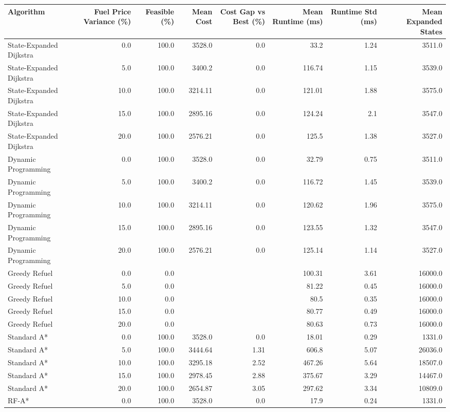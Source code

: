 \begin{tabular}{lrrrrrrr}
\hline
Algorithm & Fuel Price Variance (\%) & Feasible (\%) & Mean Cost & Cost Gap vs Best (\%) & Mean Runtime (ms) & Runtime Std (ms) & Mean Expanded States \\
\hline
State-Expanded Dijkstra & 0.0 & 100.0 & 3528.0 & 0.0 & 33.2 & 1.24 & 3511.0 \\
State-Expanded Dijkstra & 5.0 & 100.0 & 3400.2 & 0.0 & 116.74 & 1.15 & 3539.0 \\
State-Expanded Dijkstra & 10.0 & 100.0 & 3214.11 & 0.0 & 121.01 & 1.88 & 3575.0 \\
State-Expanded Dijkstra & 15.0 & 100.0 & 2895.16 & 0.0 & 124.24 & 2.1 & 3547.0 \\
State-Expanded Dijkstra & 20.0 & 100.0 & 2576.21 & 0.0 & 125.5 & 1.38 & 3527.0 \\
Dynamic Programming & 0.0 & 100.0 & 3528.0 & 0.0 & 32.79 & 0.75 & 3511.0 \\
Dynamic Programming & 5.0 & 100.0 & 3400.2 & 0.0 & 116.72 & 1.45 & 3539.0 \\
Dynamic Programming & 10.0 & 100.0 & 3214.11 & 0.0 & 120.62 & 1.96 & 3575.0 \\
Dynamic Programming & 15.0 & 100.0 & 2895.16 & 0.0 & 123.55 & 1.32 & 3547.0 \\
Dynamic Programming & 20.0 & 100.0 & 2576.21 & 0.0 & 125.14 & 1.14 & 3527.0 \\
Greedy Refuel & 0.0 & 0.0 &  &  & 100.31 & 3.61 & 16000.0 \\
Greedy Refuel & 5.0 & 0.0 &  &  & 81.22 & 0.45 & 16000.0 \\
Greedy Refuel & 10.0 & 0.0 &  &  & 80.5 & 0.35 & 16000.0 \\
Greedy Refuel & 15.0 & 0.0 &  &  & 80.77 & 0.49 & 16000.0 \\
Greedy Refuel & 20.0 & 0.0 &  &  & 80.63 & 0.73 & 16000.0 \\
Standard A* & 0.0 & 100.0 & 3528.0 & 0.0 & 18.01 & 0.29 & 1331.0 \\
Standard A* & 5.0 & 100.0 & 3444.64 & 1.31 & 606.8 & 5.07 & 26036.0 \\
Standard A* & 10.0 & 100.0 & 3295.18 & 2.52 & 467.26 & 5.64 & 18507.0 \\
Standard A* & 15.0 & 100.0 & 2978.45 & 2.88 & 375.67 & 3.29 & 14467.0 \\
Standard A* & 20.0 & 100.0 & 2654.87 & 3.05 & 297.62 & 3.34 & 10809.0 \\
RF-A* & 0.0 & 100.0 & 3528.0 & 0.0 & 17.9 & 0.24 & 1331.0 \\

\end{tabular}
